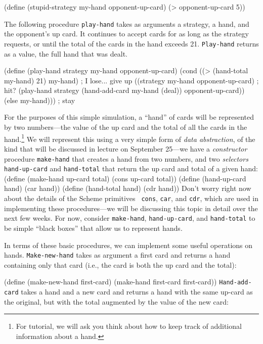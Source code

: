 \beginlisp
(define (stupid-strategy my-hand opponent-up-card)
  (> opponent-up-card 5))
\endlisp

The following procedure {\tt play-hand} takes as arguments a strategy,
a hand, and the opponent's up card.  It continues to accept cards for
as long as the strategy requests, or until the total of the cards in
the hand exceeds 21.  {\tt Play-hand} returns as a value, the full
hand that was dealt.

\beginlisp
(define (play-hand strategy my-hand opponent-up-card)
  (cond ((> (hand-total my-hand) 21) my-hand) ; I lose... give up
        ((strategy my-hand opponent-up-card) ; hit?
         (play-hand strategy
                    (hand-add-card my-hand (deal))
                    opponent-up-card))
        (else my-hand)))                ; stay
\endlisp

For the purposes of this simple simulation, a ``hand'' of cards will
be represented by two numbers---the value of the up card and the total
of all the cards in the hand.\footnote{For tutorial, we will ask you
think about how to keep track of additional information about a hand.}
We will represent this using a very simple form of {\em data
abstraction}, of the kind that will be discussed in lecture on
September 25---we have a {\em constructor} procedure {\tt make-hand}
that creates a hand from two numbers, and two {\em selectors} {\tt
hand-up-card} and {\tt hand-total} that return the up card and total
of a given hand:
\beginlisp
(define (make-hand up-card total)
  (cons up-card total))
\null
(define (hand-up-card hand)
  (car hand))
\null
(define (hand-total hand)
  (cdr hand))
\endlisp
Don't worry right now about the details of the Scheme primitives {\tt
cons}, {\tt car}, and {\tt cdr}, which are used in implementing these
procedures---we will be discussing this topic in detail over the next
few weeks.  For now, consider {\tt make-hand}, {\tt hand-up-card}, and
{\tt hand-total} to be simple ``black boxes'' that allow us to
represent hands.

In terms of these basic procedures, we can implement some useful
operations on hands. {\tt Make-new-hand} takes as argument a first
card and returns a hand containing only that card (i.e., the card is
both the up card and the total):

\beginlisp
(define (make-new-hand first-card)
  (make-hand first-card first-card))
\endlisp
{\tt Hand-add-card} takes a hand and a new card and returns a hand with
the same up-card as the original, but with the total augmented by the
value of the new card:

